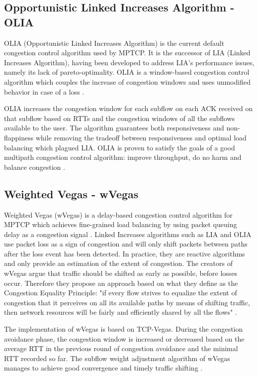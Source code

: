 \subsection{Opportunistic Linked Increases Algorithm - OLIA}
OLIA (Opportunistic Linked Increases Algorithm) is the current default congestion control algorithm used by MPTCP. It is the successor of LIA (Linked Increases Algorithm), having been developed to address LIA's performance issues, namely its lack of pareto-optimality. OLIA is a window-based congestion control algorithm which couples the increase of congestion windows and uses unmodified behavior in case of a loss \cite{olia}.

OLIA increases the congestion window for each subflow on each ACK received on that subflow based on RTTs and the congestion windows of all the subflows available to the user. The algorithm guarantees both responsiveness and non-flappiness while removing the tradeoff between responsiveness and optimal load balancing which plagued LIA. OLIA is proven to satisfy the goals of a good multipath congestion control algorithm: improve throughput, do no harm and balance congestion \cite{olia}.

\subsection{Weighted Vegas - wVegas}
Weighted Vegas (wVegas) is a delay-based congestion control algorithm for MPTCP which achieves fine-grained load balancing by using packet queuing delay as a congestion signal \cite{wvegas}. Linked Increases algorithms such as LIA and OLIA use packet loss as a sign of congestion and will only shift packets between paths after the loss event has been detected. In practice, they are reactive algorithms and only provide an estimation of the extent of congestion. The creators of wVegas argue that traffic should be shifted as early as possible, before losses occur. Therefore they propose an approach based on what they define as the Congestion Equality Principle: "if every flow strives to equalize the extent of congestion that it perceives on all its available paths by means of shifting traffic, then network resources will be fairly and efficiently shared by all the flows" \cite{wvegas}.

The implementation of wVegas is based on TCP-Vegas. During the congestion avoidance phase, the congestion window is increased or decreased based on the average RTT in the previous round of congestion avoidance and the minimal RTT recorded so far. The subflow weight adjustment algorithm of wVegas manages to achieve good convergence and timely traffic shifting \cite{wvegas}.


